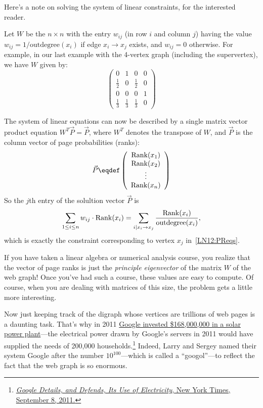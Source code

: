 \begin{editingnotes}
Here's a note on solving the system of linear constraints, for the
interested reader.

Let $W$ be the $n \times n$ with the entry $w_{ij}$ (in row $i$ and
column $j$) having the value $w_{ij} = 1/\text{outdegree}(x_i)$ if edge
$x_i \rightarrow x_j$ exists, and $w_{ij} = 0$ otherwise.  For example, in
our last example with the 4-vertex graph (including the supervertex), we have
$W$ given by:
\[
\left( \begin{array}{cccc}
    0 & 1 & 0 & 0 \\
    \frac{1}{2} & 0 & \frac{1}{2} & 0 \\
    0 & 0 & 0 & 1\\
    \frac{1}{3} & \frac{1}{3} & \frac{1}{3} & 0 \end{array} \right)
\]

The system of linear equations can now be described by a single matrix
vector product equation $W^T \vec{P} = \vec{P}$, where $W^T$ denotes the
transpose of $W$, and $\vec{P}$ is the column vector of page probabilities
(ranks):
\[\vec{P}\eqdef
\left( \begin{array}{c}
    \PRnk(x_1) \\
    \PRnk(x_2) \\
    \vdots \\
    \PRnk(x_n) \end{array} \right)
\]
So the $j$th entry of the solultion vector $\vec{P}$ is
\[
\sum_{1\leq i \leq n} w_{ij} \cdot \operatorname{Rank}(x_i) =
\sum_{i \mid x_i \rightarrow x_j} \frac{\operatorname{Rank}(x_i)}{\text{outdegree}(x_i)},
\]
which is exactly the constraint corresponding to vertex $x_j$
in~\eqref{LN12:PReqs}.

If you have taken a linear algebra or numerical analysis course, you
realize that the vector of page ranks is just the \emph{principle
  eigenvector} of the matrix $W$ of the web graph!  Once you've had such
a course, these values are easy to compute.  Of course, when you are
dealing with matrices of this size, the problem gets a little more
interesting.

\end{editingnotes}

Now just keeping track of the digraph whose vertices are trillions of
web pages is a daunting task.  That's why in 2011
\href{http://phys.org/news/2011-04-google-invests-million-solar-power.html}{Google
  invested \$168,000,000 in a solar power plant}---the electrical
power drawn by Google's servers in 2011 would have supplied the needs
of 200,000
households.\footnote{\href{http://www.nytimes.com/2011/09/09/technology/google-details-and-defends-its-use-of-electricity.html}
{\emph{Google Details, and Defends, Its Use of Electricity}, New York
  Times, September 8, 2011.}}  Indeed, Larry and Sergey named their
system Google after the number $10^{100}$---which is called a
``googol''---to reflect the fact that the web graph is so enormous.

